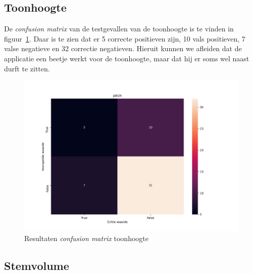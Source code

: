 \subsection{Toonhoogte}
De \textit{confusion matrix} van de testgevallen van de toonhoogte is te vinden in figuur~\ref{fig:cfm_pitch}. Daar is te zien dat er 5 correcte positieven zijn, 10 vals positieven, 7 valse negatieve en 32 correctie negatieven.
Hieruit kunnen we afleiden dat de applicatie een beetje werkt voor de toonhoogte, maar dat hij er soms wel naast durft te zitten.
\begin{figure}
	\centering
	\includegraphics[width=1\textwidth]{./img/cfm_pitch}
	\caption{\label{fig:cfm_pitch} Resultaten \textit{confusion matrix} toonhoogte}
\end{figure}

\subsection{Stemvolume}

